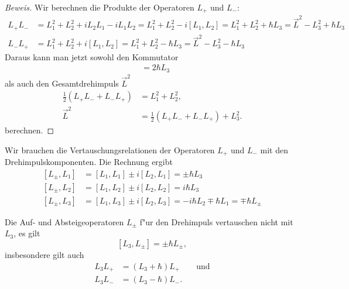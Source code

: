 \begin{proof}[Beweis]
Wir berechnen die Produkte der Operatoren $L_+$ und $L_-$:
\begin{align}
L_+L_-
&=
L_1^2+L_2^2 +iL_2L_1-iL_1L_2=L_1^2+L_2^2 -i[L_1,L_2]=L_1^2+L_2^2+\hbar L_3
=\vec L^2-L_3^2+\hbar L_3
\label{skript:l+l-}
\\
L_-L_+
&=
L_1^2  + L_2^2 +i[L_1,L_2]=L_1^2+L_2^2-\hbar L_3
=\vec L^2-L_3^2-\hbar L_3
\label{skript:l-l+}
\end{align}
Daraus kann man jetzt sowohl den Kommutator
\begin{align*}
[L_+,L_-]
&=
2\hbar L_3
\end{align*}
als auch den Gesamtdrehimpuls $\vec L^2$
\begin{align*}
{\textstyle \frac12}(L_+L_-+L_-L_+)&=L_1^2+L_2^2,
\\
\vec L^2
&=
{\textstyle\frac12}(L_+L_-+L_-L_+)+L_3^2.
\end{align*}
berechnen.
\end{proof}

Wir brauchen die Vertauschungsrelationen der Operatoren $L_+$ und $L_-$
mit den Drehimpulskomponenten.
Die Rechnung ergibt
\begin{equation}
\begin{aligned} 
\phantom{ }	%
[L_\pm, L_1]
&=
[L_1,L_1]\pm i[L_2,L_1]
=
\pm \hbar L_3
\\
[L_\pm, L_2]
&=
[L_1,L_2]\pm i[L_2,L_2]
=
i\hbar L_3
\\
[L_\pm,L_3]
&=
[L_1,L_3]\pm i[L_2,L_3]
=
-i\hbar L_2
\mp
\hbar L_1
=
\mp \hbar L_\pm
\end{aligned}
\label{skript:lpmlkommutator}
\end{equation}

\begin{hilfssatz}
Die Auf- und Absteigeoperatoren $L_\pm$ f"ur den Drehimpuls vertauschen 
nicht mit $L_3$, es gilt
\[
[L_3,L_\pm]=\pm\hbar L_{\pm},
\]
insbesondere gilt auch
\begin{align*}
L_3L_+&=(L_3+\hbar)L_+\qquad\text{und}\\
L_3L_-&=(L_3-\hbar)L_-.
\end{align*}
\label{skript:laufab}
\end{hilfssatz}


